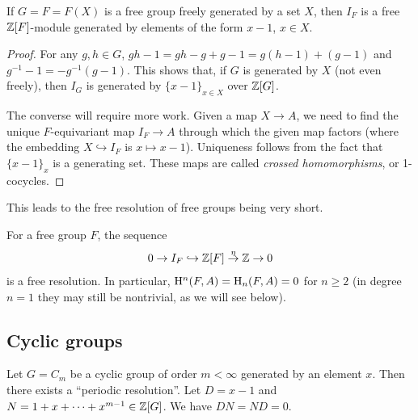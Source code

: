 \begin{thm}
    If $G=F=F(X)$ is a free group freely generated by a set $X$, then $I_F$ is a free $\mathbb{Z}[F]$-module generated by elements of the form $x-1$, $x\in X$.
\end{thm}
\begin{proof}
    For any $g,h\in G$, $gh-1=gh-g+g-1=g(h-1)+(g-1)$ and $g^{-1}-1=-g^{-1}(g-1)$. This shows that, if $G$ is generated by $X$ (not even freely), then $I_G$ is generated by $\{x-1\}_{x\in X}$ over $\mathbb{Z}[G]$.

    The converse will require more work. Given a map $X\to A$, we need to find the unique $F$-equivariant map $I_F\to A$ through which the given map factors (where the embedding $X\hookrightarrow I_F$ is $x\mapsto x-1$). Uniqueness follows from the fact that $\{x-1\}_x$ is a generating set. These maps are called \emph{crossed homomorphisms}, or 1-cocycles.
\end{proof}

This leads to the free resolution of free groups being very short.
\begin{cor}
    For a free group $F$, the sequence
    \[0\to I_F\hookrightarrow \mathbb{Z}[F]\overset{\eta}{\to} \mathbb{Z}\to 0\]
    is a free resolution. In particular, $\mathrm{H}^n(F,A)=\mathrm{H}_n(F,A)=0$ for $n\geq 2$ (in degree $n=1$ they may still be nontrivial, as we will see below).
\end{cor}





\subsection{Cyclic groups}


Let $G=C_m$ be a cyclic group of order $m<\infty$ generated by an element $x$. Then there exists a ``periodic resolution''. Let $D=x-1$ and $N=1+x+\cdots +x^{m-1}\in\mathbb{Z}[G]$. We have $DN=ND=0$.

